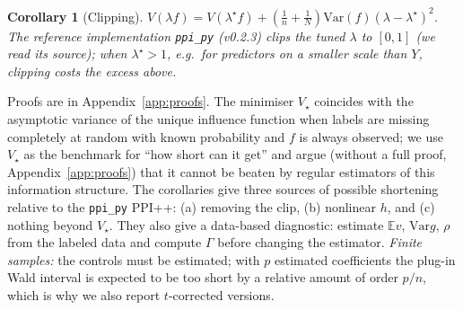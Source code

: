 \documentclass{article}
\newcommand{\E}{\mathbb{E}}
\newcommand{\Var}{\mathrm{Var}}
\newtheorem{corollary}{Corollary}
\begin{document}
\begin{corollary}[Clipping]\label{cor:clip}
$V(\lambda f)=V(\lambda^\star f)+(\tfrac1n+\tfrac1N)\Var(f)(\lambda-\lambda^\star)^2$. The reference implementation \texttt{ppi\_py} (v0.2.3) clips the tuned $\lambda$ to $[0,1]$ (we read its source); when $\lambda^\star>1$, e.g.\ for predictors on a smaller scale than $Y$, clipping costs the excess above.
\end{corollary}

Proofs are in Appendix~\ref{app:proofs}. The minimiser $V_\star$ coincides with the asymptotic variance of the unique influence function when labels are missing completely at random with known probability and $f$ is always observed; we use $V_\star$ as the benchmark for ``how short can it get'' and argue (without a full proof, Appendix~\ref{app:proofs}) that it cannot be beaten by regular estimators of this information structure. The corollaries give three sources of possible shortening relative to the \texttt{ppi\_py} PPI++: (a) removing the clip, (b) nonlinear $h$, and (c) nothing beyond $V_\star$. They also give a data-based diagnostic: estimate $\E v$, $\Var g$, $\rho$ from the labeled data and compute $\Gamma$ before changing the estimator. \emph{Finite samples:} the controls must be estimated; with $p$ estimated coefficients the plug-in Wald interval is expected to be too short by a relative amount of order $p/n$, which is why we also report $t$-corrected versions.
\end{document}
